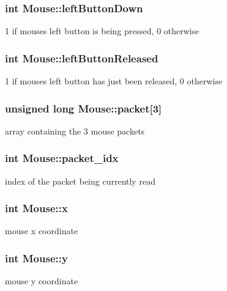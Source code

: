 \subsubsection[{\texorpdfstring{left\+Button\+Down}{leftButtonDown}}]{\setlength{\rightskip}{0pt plus 5cm}int Mouse\+::left\+Button\+Down}\hypertarget{group__Mouse_ga401d046e1cad0fad3908120ab85b9396}{}\label{group__Mouse_ga401d046e1cad0fad3908120ab85b9396}
1 if mouse\textquotesingle{}s left button is being pressed, 0 otherwise 
\subsubsection[{\texorpdfstring{left\+Button\+Released}{leftButtonReleased}}]{\setlength{\rightskip}{0pt plus 5cm}int Mouse\+::left\+Button\+Released}\hypertarget{group__Mouse_ga9a74cd5fb66c4936d44a72962df7830c}{}\label{group__Mouse_ga9a74cd5fb66c4936d44a72962df7830c}
1 if mouse\textquotesingle{}s left button has just been released, 0 otherwise 
\subsubsection[{\texorpdfstring{packet}{packet}}]{\setlength{\rightskip}{0pt plus 5cm}unsigned long Mouse\+::packet\mbox{[}3\mbox{]}}\hypertarget{group__Mouse_ga8bfb0c35eb14423f5086a355d52dc733}{}\label{group__Mouse_ga8bfb0c35eb14423f5086a355d52dc733}
array containing the 3 mouse packets 
\subsubsection[{\texorpdfstring{packet\+\_\+idx}{packet_idx}}]{\setlength{\rightskip}{0pt plus 5cm}int Mouse\+::packet\+\_\+idx}\hypertarget{group__Mouse_ga1fc496df2223cb17437b296acbe02e50}{}\label{group__Mouse_ga1fc496df2223cb17437b296acbe02e50}
index of the packet being currently read 
\subsubsection[{\texorpdfstring{x}{x}}]{\setlength{\rightskip}{0pt plus 5cm}int Mouse\+::x}\hypertarget{group__Mouse_ga136eea114b70f46392b89cc3779d4291}{}\label{group__Mouse_ga136eea114b70f46392b89cc3779d4291}
mouse x coordinate 
\subsubsection[{\texorpdfstring{y}{y}}]{\setlength{\rightskip}{0pt plus 5cm}int Mouse\+::y}\hypertarget{group__Mouse_ga4a29b1c18faaa2fbe39ff985ba9d6737}{}\label{group__Mouse_ga4a29b1c18faaa2fbe39ff985ba9d6737}
mouse y coordinate 
